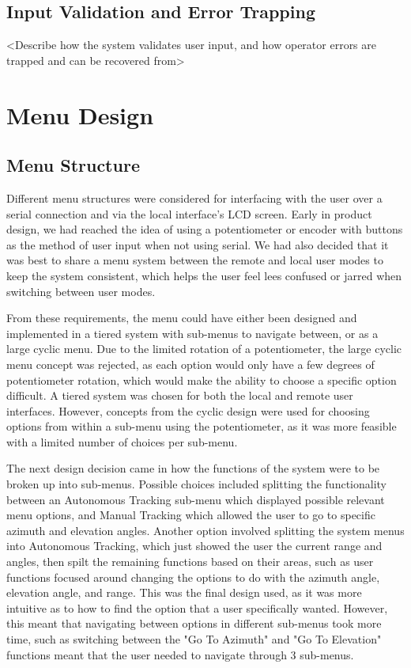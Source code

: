 \documentclass[]{report}
\begin{document}
\subsection{Input Validation and Error Trapping}
<Describe how the system validates user input, and how operator errors are trapped and can be recovered from>

\section{Menu Design}
\subsection{Menu Structure}
Different menu structures were considered for interfacing with the user over a serial connection and via the local interface's LCD screen. Early in product design, we had reached the idea of using a potentiometer or encoder with buttons as the method of user input when not using serial. We had also decided that it was best to share a menu system between the remote and local user modes to keep the system consistent, which helps the user feel lees confused or jarred when switching between user modes. 


From these requirements, the menu could have either been designed and implemented in a tiered system with sub-menus to navigate between, or as a large cyclic menu. Due to the limited rotation of a potentiometer, the large cyclic menu concept was rejected, as each option would only have a few degrees of potentiometer rotation, which would make the ability to choose a specific option difficult. A tiered system was chosen for both the local and remote user interfaces. However, concepts from the cyclic design were used for choosing options from within a sub-menu using the potentiometer, as it was more feasible with a limited number of choices per sub-menu. 


The next design decision came in how the functions of the system were to be broken up into sub-menus. Possible choices included splitting the functionality between an Autonomous Tracking sub-menu which displayed possible relevant menu options, and Manual Tracking which allowed the user to go to specific azimuth and elevation angles. Another option involved splitting the system menus into Autonomous Tracking, which just showed the user the current range and angles, then spilt the remaining functions based on their areas, such as user functions focused around changing the options to do with the azimuth angle, elevation angle, and range. This was the final design used, as it was more intuitive as to how to find the option that a user specifically wanted. However, this meant that navigating between options in different sub-menus took more time, such as switching between the "Go To Azimuth" and "Go To Elevation" functions meant that the user needed to navigate through 3 sub-menus.
\end{document}
